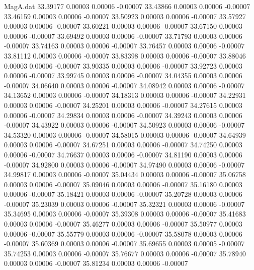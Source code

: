 \begin{filecontents}{MagA.dat}
  33.39177    0.00003    0.00006   -0.00007
  33.43866    0.00003    0.00006   -0.00007
  33.46159    0.00003    0.00006   -0.00007
  33.50923    0.00003    0.00006   -0.00007
  33.57927    0.00003    0.00006   -0.00007
  33.60221    0.00003    0.00006   -0.00007
  33.67150    0.00003    0.00006   -0.00007
  33.69492    0.00003    0.00006   -0.00007
  33.71793    0.00003    0.00006   -0.00007
  33.74163    0.00003    0.00006   -0.00007
  33.76457    0.00003    0.00006   -0.00007
  33.81112    0.00003    0.00006   -0.00007
  33.83398    0.00003    0.00006   -0.00007
  33.88046    0.00003    0.00006   -0.00007
  33.90335    0.00003    0.00006   -0.00007
  33.92723    0.00003    0.00006   -0.00007
  33.99745    0.00003    0.00006   -0.00007
  34.04355    0.00003    0.00006   -0.00007
  34.06640    0.00003    0.00006   -0.00007
  34.08942    0.00003    0.00006   -0.00007
  34.13652    0.00003    0.00006   -0.00007
  34.18313    0.00003    0.00006   -0.00007
  34.22931    0.00003    0.00006   -0.00007
  34.25201    0.00003    0.00006   -0.00007
  34.27615    0.00003    0.00006   -0.00007
  34.29834    0.00003    0.00006   -0.00007
  34.39243    0.00003    0.00006   -0.00007
  34.43922    0.00003    0.00006   -0.00007
  34.50923    0.00003    0.00006   -0.00007
  34.53320    0.00003    0.00006   -0.00007
  34.58015    0.00003    0.00006   -0.00007
  34.64939    0.00003    0.00006   -0.00007
  34.67251    0.00003    0.00006   -0.00007
  34.74250    0.00003    0.00006   -0.00007
  34.76637    0.00003    0.00006   -0.00007
  34.81190    0.00003    0.00006   -0.00007
  34.92800    0.00003    0.00006   -0.00007
  34.97490    0.00003    0.00006   -0.00007
  34.99817    0.00003    0.00006   -0.00007
  35.04434    0.00003    0.00006   -0.00007
  35.06758    0.00003    0.00006   -0.00007
  35.09046    0.00003    0.00006   -0.00007
  35.16180    0.00003    0.00006   -0.00007
  35.18421    0.00003    0.00006   -0.00007
  35.20728    0.00003    0.00006   -0.00007
  35.23039    0.00003    0.00006   -0.00007
  35.32321    0.00003    0.00006   -0.00007
  35.34695    0.00003    0.00006   -0.00007
  35.39308    0.00003    0.00006   -0.00007
  35.41683    0.00003    0.00006   -0.00007
  35.46277    0.00003    0.00006   -0.00007
  35.50977    0.00003    0.00006   -0.00007
  35.55779    0.00003    0.00006   -0.00007
  35.58078    0.00003    0.00006   -0.00007
  35.60369    0.00003    0.00006   -0.00007
  35.69655    0.00003    0.00005   -0.00007
  35.74253    0.00003    0.00006   -0.00007
  35.76677    0.00003    0.00006   -0.00007
  35.78940    0.00003    0.00006   -0.00007
  35.81234    0.00003    0.00006   -0.00007

\end{filecontents}
